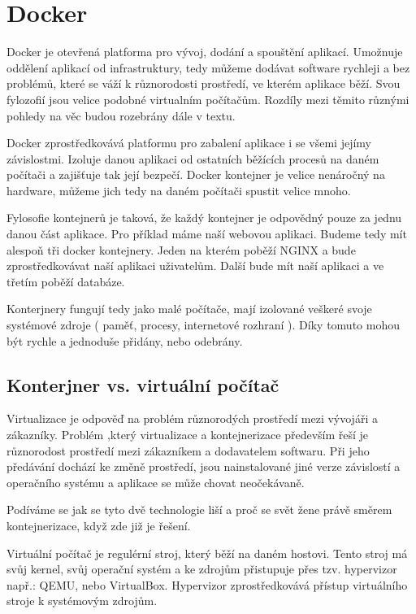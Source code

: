 \section{Docker}

Docker je otevřená platforma pro vývoj, dodání a spouštění aplikací. Umožnuje oddělení aplikací od infrastruktury, tedy můžeme dodávat software rychleji a bez problémů, které se váží k různorodosti prostředí, ve kterém aplikace běží. Svou fylozofií jsou velice podobné virtualním počítačům. Rozdíly mezi těmito různými pohledy na věc budou rozebrány dále v textu. 

Docker zprostředkovává platformu pro zabalení aplikace i se všemi jejímy závislostmi. Izoluje danou aplikaci od ostatních běžících procesů na daném počítači a zajišťuje tak její bezpečí. Docker kontejner je velice nenáročný na hardware, můžeme jich tedy na daném počítači spustit velice mnoho.  

Fylosofie kontejnerů je taková, že každý kontejner je odpovědný pouze za jednu danou část aplikace. Pro příklad máme naší webovou aplikaci. Budeme tedy mít alespoň tři docker kontejnery. Jeden na kterém poběží NGINX a bude zprostředkovávat naší aplikaci uživatelům. Další bude mít naší aplikaci a ve třetím poběží databáze. 

Konterjnery fungují tedy jako malé počítače, mají izolované veškeré svoje systémové zdroje ( paměť, procesy, internetové rozhraní ). Díky tomuto mohou být rychle a jednoduše přidány, nebo odebrány.  


\subsection{Konterjner vs. virtuální počítač}

Virtualizace je odpověď na problém různorodých prostředí mezi vývojáři a zákazníky. Problém ,který virtualizace a kontejnerizace především řeší je různorodost prostředí mezi zákazníkem a dodavatelem softwaru. Při jeho předávání dochází ke změně prostředí, jsou nainstalované jiné verze závislostí a operačního systému a aplikace se může chovat neočekávaně. 

Podíváme se jak se tyto dvě technologie liší a proč se svět žene právě směrem kontejnerizace, když zde již je řešení.

Virtuální počítač je regulérní stroj, který běží na daném hostovi. Tento stroj má svůj kernel, svůj operační systém a ke zdrojům přistupuje přes tzv. hypervizor např.: QEMU, nebo VirtualBox. Hypervizor zprostředkovává přístup virtuálního stroje k systémovým zdrojům. 

